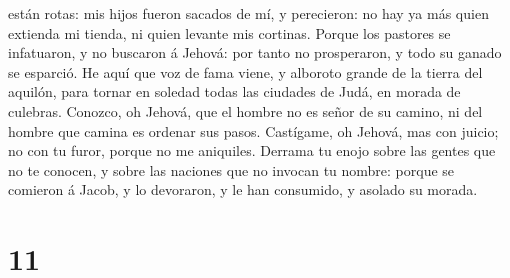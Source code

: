 están rotas: mis hijos fueron sacados de mí, y perecieron: no hay ya más
quien extienda mi tienda, ni quien levante mis cortinas. 
Porque los pastores se infatuaron, y no buscaron á Jehová: por tanto no
prosperaron, y todo su ganado se esparció.  He aquí que voz
de fama viene, y alboroto grande de la tierra del aquilón, para tornar
en soledad todas las ciudades de Judá, en morada de culebras.
 Conozco, oh Jehová, que el hombre no es señor de su
camino, ni del hombre que camina es ordenar sus pasos. 
Castígame, oh Jehová, mas con juicio; no con tu furor, porque no me
aniquiles.  Derrama tu enojo sobre las gentes que no te
conocen, y sobre las naciones que no invocan tu nombre: porque se
comieron á Jacob, y lo devoraron, y le han consumido, y asolado su
morada.

\hypertarget{section-10}{%
\section{11}\label{section-10}}

